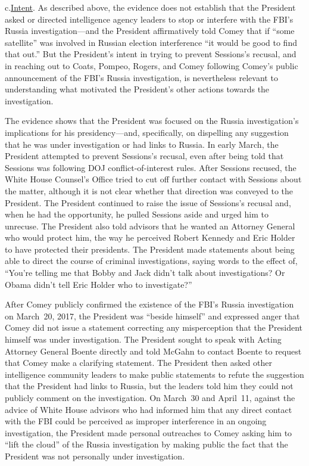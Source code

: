 c.\qquad\underline{Intent}.
As described above, the evidence does not establish that the President asked or directed intelligence agency leaders to stop or interfere with the FBI's Russia investigation---and the President affirmatively told Comey that if ``some satellite'' was involved in Russian election interference ``it would be good to find that out.''
But the President's intent in trying to prevent Sessions's recusal, and in reaching out to Coats, Pompeo, Rogers, and Comey following Comey's public announcement of the FBI's Russia investigation, is nevertheless relevant to understanding what motivated the President's other actions towards the investigation.

The evidence shows that the President was focused on the Russia investigation's implications for his presidency---and, specifically, on dispelling any suggestion that he was under investigation or had links to Russia.
In early March, the President attempted to prevent Sessions's recusal, even after being told that Sessions was following DOJ conflict-of-interest rules.
After Sessions recused, the White House Counsel's Office tried to cut off further contact with Sessions about the matter, although it is not clear whether that direction was conveyed to the President.
The President continued to raise the issue of Sessions's recusal and, when he had the opportunity, he pulled Sessions aside and urged him to unrecuse.
The President also told advisors that he wanted an Attorney General who would protect him, the way he perceived Robert Kennedy and Eric Holder to have protected their presidents.
The President made statements about being able to direct the course of criminal investigations, saying words to the effect of, ``You're telling me that Bobby and Jack didn't talk about investigations?
Or Obama didn't tell Eric Holder who to investigate?''

After Comey publicly confirmed the existence of the FBI's Russia investigation on March~20, 2017, the President was ``beside himself\thinspace'' and expressed anger that Comey did not issue a statement correcting any misperception that the President himself was under investigation.
The President sought to speak with Acting Attorney General Boente directly and told McGahn to contact Boente to request that Comey make a clarifying statement.
The President then asked other intelligence community leaders to make public statements to refute the suggestion that the President had links to Russia, but the leaders told him they could not publicly comment on the investigation.
On March~30 and April~11, against the advice of White House advisors who had informed him that any direct contact with the FBI could be perceived as improper interference in an ongoing investigation, the President made personal outreaches to Comey asking him to ``lift the cloud'' of the Russia investigation by making public the fact that the President was not personally under investigation.

